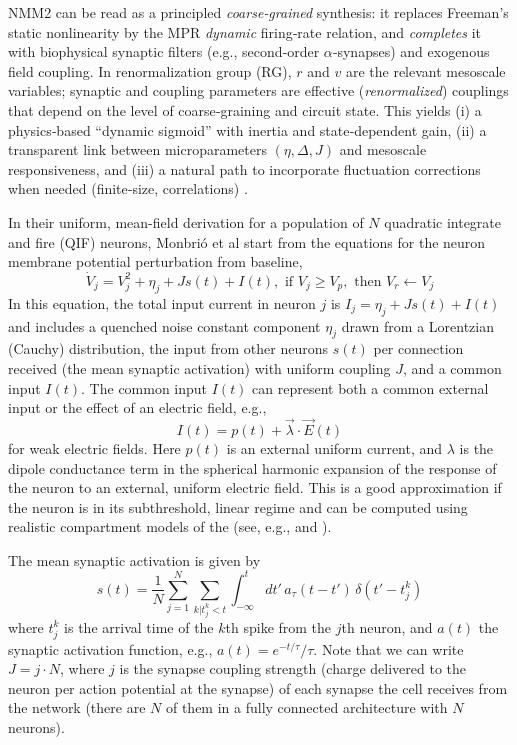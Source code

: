 \documentclass[12pt]{article}
\numberwithin{equation}{section}
\begin{document}
 
NMM2 can be read as a principled \emph{coarse‑grained} synthesis: it replaces Freeman’s static nonlinearity by the MPR \emph{dynamic} firing‑rate relation, and \emph{completes} it with biophysical synaptic filters (e.g., second‑order $\alpha$‑synapses) and exogenous field coupling. In renormalization group (RG), $r$ and $v$ are the relevant mesoscale variables; synaptic and coupling parameters are effective (\emph{renormalized}) couplings that depend on the level of coarse‑graining and circuit state. This yields (i) a physics‑based “dynamic sigmoid” with inertia and state‑dependent gain, (ii) a transparent link between microparameters $(\eta,\Delta,J)$ and mesoscale responsiveness, and (iii) a natural path to incorporate fluctuation corrections when needed (finite‑size, correlations) \cite{buiceSystematicFluctuationExpansion2010}.  %


In their uniform,  mean-field derivation for a population of $N$  quadratic integrate and fire (QIF) neurons, Monbri\'o et al \cite{Montbrio:2015aa}  start from the equations  for the neuron membrane potential perturbation from baseline,
\begin{equation} \label{eq:qif}
\dot V_j = V_j^2 + \eta_j + J s(t) + I(t), \mbox{ if } V_j \ge V_p, \mbox{ then } V_r \leftarrow V_j
\end{equation}
In this equation, the total input current in neuron $j$ is  $I_j =  \eta_j + J s(t) + I(t)$ and includes a quenched noise constant component $\eta_j$ drawn from a Lorentzian (Cauchy) distribution, the input from other neurons $s(t)$ per connection received (the mean synaptic activation) with uniform coupling $J$, and a common input $I(t)$. The common input $I(t)$ can  represent both a common external input or the effect of an electric field, e.g.,
\begin{equation}
 I(t) =  p(t) + \vec \lambda \cdot \vec E(t)   
\end{equation}
for weak electric fields.
Here $p(t)$ is an external uniform current, and $\lambda$ is the dipole conductance term in the spherical harmonic expansion of the response of the neuron to an external, uniform electric field.   This is a good approximation if the neuron is in its subthreshold, linear regime and can be computed using realistic compartment models of the  (see, e.g., \cite{aberra_biophysically_2018} and \cite{Galan:2021aa}). 

The mean synaptic activation is given by
\begin{equation}
    s(t) = \frac{1}{N}\sum_{j=1}^N \sum_{k | t^k_j < t} \int_{-\infty}^t dt' \, a_\tau(t-t') \, \delta(t'-t^k_j)
\end{equation}
where  $t^k_j$ is  the arrival time of the $k$th spike from the $j$th neuron, and  $a(t)$ the synaptic activation function, e.g., $a(t) = e^{-t/\tau}/\tau$.  Note that we can write $J=j\cdot N$, where $j$ is the synapse coupling strength (charge delivered to the neuron per action potential at the synapse) of each synapse the cell receives from the network (there are $N$ of them in a fully connected architecture with $N$ neurons). 
\end{document}

